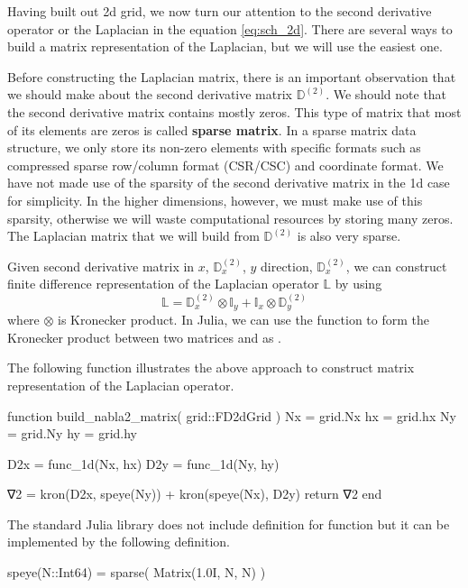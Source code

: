 Having built out 2d grid, we now turn our attention to the second derivative operator or
the Laplacian in the equation \ref{eq:sch_2d}.
There are several ways to build a matrix representation of the Laplacian, but we will
use the easiest one. 

Before constructing the Laplacian matrix, there is an important observation that
we should make about the second derivative matrix $\mathbb{D}^{(2)}$. We should note
that the second derivative matrix contains mostly zeros. This type of matrix that
most of its elements are zeros is called \textbf{sparse matrix}.
In a sparse matrix data structure, we only store its non-zero elements with specific
formats such as compressed sparse row/column format (CSR/CSC) and coordinate format.
We have not made use of the sparsity of the second derivative matrix
in the 1d case for simplicity. In the higher dimensions, however,
we must make use of this sparsity, otherwise we will waste computational resources 
by storing many zeros. The Laplacian matrix that we will build from
$\mathbb{D}^{(2)}$ is also very sparse.

Given second derivative matrix in $x$, $\mathbb{D}^{(2)}_{x}$,
$y$ direction, $\mathbb{D}^{(2)}_{x}$,
we can construct finite difference representation of the Laplacian operator
$\mathbb{L}$ by using
%
\begin{equation}
\mathbb{L} = \mathbb{D}^{(2)}_{x} \otimes \mathbb{I}_{y} +
\mathbb{I}_{x} \otimes \mathbb{D}^{(2)}_{y}
\end{equation}
%
where $\otimes$ is Kronecker product.
In Julia, we can use the function  to form the Kronecker product
between two matrices  and  as .

The following function illustrates the above approach to construct matrix
representation of the Laplacian operator.
\begin{juliacode}
function build_nabla2_matrix( grid::FD2dGrid )
  Nx = grid.Nx
  hx = grid.hx
  Ny = grid.Ny
  hy = grid.hy
    
  D2x = func_1d(Nx, hx)
  D2y = func_1d(Ny, hy)

  ∇2 = kron(D2x, speye(Ny)) + kron(speye(Nx), D2y)
  return ∇2
end
\end{juliacode}

The standard Julia library does not include definition for  function
but it can be implemented by the following definition.
\begin{juliacode}
speye(N::Int64) = sparse( Matrix(1.0I, N, N) )
\end{juliacode}

